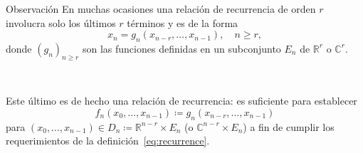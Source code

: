 \begin{frame}
\frametitle{\subsecname}

\begin{alertblock}{Observación}
	En muchas ocasiones una relación de recurrencia de orden $r$ involucra solo los últimos $r$ términos y es de la forma \[ x_{n}=g_{n}\left(x_{n-r},\ldots,x_{n-1}\right),\quad n\geq r, \] donde ${\left(g_{n}\right)}_{n\geq r}$ son las funciones definidas en un subconjunto $E_{n}$ de $\mathds{R}^{r}$ o $\mathds{C}^{r}$.

	\

	Este último es de hecho una relación de recurrencia: es suficiente para establecer \[ f_{n}\left(x_{0},\ldots,x_{n-1}\right)\coloneqq g_{n}\left(x_{n-r},\ldots,x_{n-1}\right) \] para $\left(x_{0},\ldots,x_{n-1}\right)\in D_{n}\coloneqq\mathds{R}^{n-r}\times E_{n}$ (o $\mathds{C}^{n-r}\times E_{n}$) a fin de cumplir los requerimientos de la definición~\eqref{eq:recurrence}.
\end{alertblock}
\end{frame}
